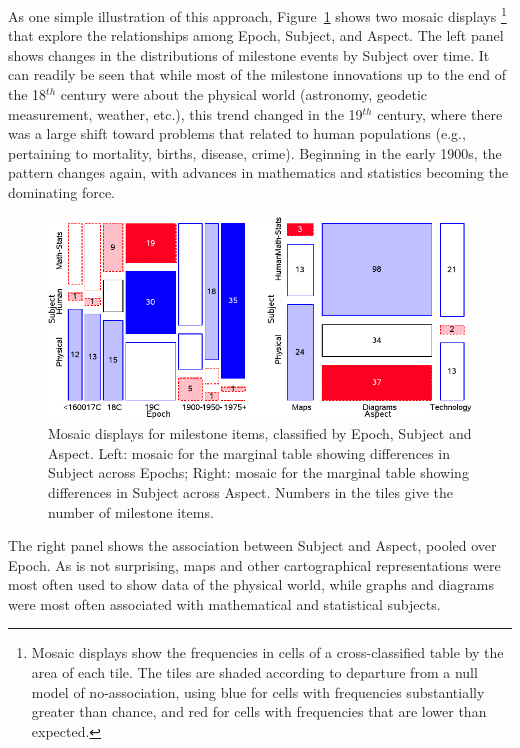 \documentclass[11pt]{article}
\newcommand*{\figref}[1]{Figure~\ref{#1}}
\newcommand{\Cent}[1]{#1$^{th}$ century}
\begin{document}
As one simple illustration of this approach, \figref{fig:milecats4} shows two mosaic displays%
\footnote{Mosaic displays show the frequencies in cells of a cross-classified table by the area of each tile.  The tiles are shaded according to departure from a null
model of no-association, using blue for cells with frequencies substantially greater than chance, and red for cells with frequencies that are lower than expected.}
that explore the relationships among Epoch, Subject, and Aspect. The left panel shows changes in the distributions of milestone events by Subject over time.  It can readily be seen that while most of the milestone innovations up to the end of the \Cent{18} were about the physical world (astronomy, geodetic measurement, weather, etc.), this trend changed in the \Cent{19}, where there was a large shift toward problems that related to human populations (e.g., pertaining to mortality, births, disease, crime). Beginning in the early 1900s, the pattern changes again, with advances in mathematics and statistics becoming the dominating force.

\begin{figure}[!htb]
  \centering
  \includegraphics[width=\textwidth,clip]{fig/milecats4}
  \caption{Mosaic displays for milestone items, classified by Epoch, Subject and Aspect. Left: mosaic for the marginal table showing differences in Subject across Epochs; Right: mosaic for the marginal table showing differences in Subject across Aspect. Numbers in the tiles give the number of milestone items.}
  \label{fig:milecats4}
\end{figure}

The right panel shows the association between Subject and Aspect, pooled over Epoch. As is not surprising, maps and other cartographical representations were most often used to show data of the physical world, while graphs and diagrams were most often associated with mathematical and statistical subjects.
\end{document}
